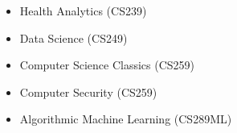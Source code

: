 \begin{cvcourses}
{\begin{multicols}{3}
\begin{itemize}
          \item Health Analytics (CS239) %
          \item Data Science (CS249) %
          \item Computer Science Classics (CS259) %
          \item Computer Security (CS259) %
          \item Algorithmic Machine Learning (CS289ML) %

\end{itemize}
\end{multicols}}
\end{cvcourses}
